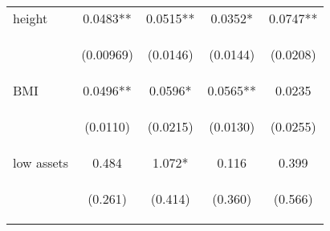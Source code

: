 \documentclass{article}[11pt,subeqn]
\begin{document}
\begin{spacing}{1.5}
\begin{table}[htpb!]
\begin{center}
\begin{tabular}{lcccc}
height & 0.0483** & 0.0515** & 0.0352* & 0.0747** \\
\vspace{4pt} & \begin{footnotesize}(0.00969)\end{footnotesize} & \begin{footnotesize}(0.0146)\end{footnotesize} & \begin{footnotesize}(0.0144)\end{footnotesize} & \begin{footnotesize}(0.0208)\end{footnotesize} \\
BMI & 0.0496** & 0.0596* & 0.0565** & 0.0235 \\
\vspace{4pt} & \begin{footnotesize}(0.0110)\end{footnotesize} & \begin{footnotesize}(0.0215)\end{footnotesize} & \begin{footnotesize}(0.0130)\end{footnotesize} & \begin{footnotesize}(0.0255)\end{footnotesize} \\
low assets & 0.484 & 1.072* & 0.116 & 0.399 \\
\vspace{4pt} & \begin{footnotesize}(0.261)\end{footnotesize} & \begin{footnotesize}(0.414)\end{footnotesize} & \begin{footnotesize}(0.360)\end{footnotesize} & \begin{footnotesize}(0.566)\end{footnotesize} \\

\end{tabular}
\end{center}
\end{table}
\end{spacing}
\end{document}
